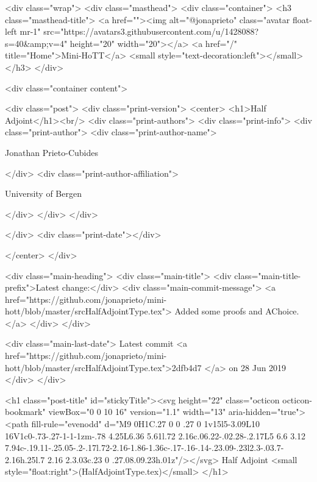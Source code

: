     <div class="wrap">
      <div class="masthead">
        <div class="container">
          <h3 class="masthead-title">
            <a href=""><img alt="@jonaprieto" class="avatar float-left mr-1" src="https://avatars3.githubusercontent.com/u/1428088?s=40&amp;v=4" height="20" width="20"></a>
            <a href="/" title="Home">Mini-HoTT</a>
            <small style="text-decoration:left"></small>
          </h3>
        </div>
      
      <div class="container content">
        







<div class="post">
  <div class="print-version">
    <center>
      <h1>Half Adjoint</h1><br/>
        <div class="print-authors">
          <div class="print-info">
            <div class="print-author">
              <div class="print-author-name">
                
                  Jonathan Prieto-Cubides
                
              </div>
              <div class="print-author-affiliation">
                
                  University of Bergen
                
                </div>
            </div>
          </div>
          
          
        </div>
        <div class="print-date"></div>
        
        
    </center>
  </div>

  
  <div class="main-heading">
    <div class="main-title">
      <div class="main-title-prefix">Latest change:</div>
      <div class="main-commit-message">
            <a href="https://github.com/jonaprieto/mini-hott/blob/master/srcHalfAdjointType.tex">
              Added some proofs and AChoice.</a>
      </div>
    </div>

    <div class="main-last-date">
      Latest commit <a href="https://github.com/jonaprieto/mini-hott/blob/master/srcHalfAdjointType.tex">2dfb4d7 </a> on  28 Jun 2019
    </div>
  </div>
  

  <h1 class="post-title" id="stickyTitle"><svg height="22" class="octicon octicon-bookmark" viewBox="0 0 10 16" version="1.1" width="13" aria-hidden="true"><path fill-rule="evenodd" d="M9 0H1C.27 0 0 .27 0 1v15l5-3.09L10 16V1c0-.73-.27-1-1-1zm-.78 4.25L6.36 5.61l.72 2.16c.06.22-.02.28-.2.17L5 6.6 3.12 7.94c-.19.11-.25.05-.2-.17l.72-2.16-1.86-1.36c-.17-.16-.14-.23.09-.23l2.3-.03.7-2.16h.25l.7 2.16 2.3.03c.23 0 .27.08.09.23h.01z"/></svg> Half Adjoint <small style="float:right">(HalfAdjointType.tex)</small>
  </h1>

